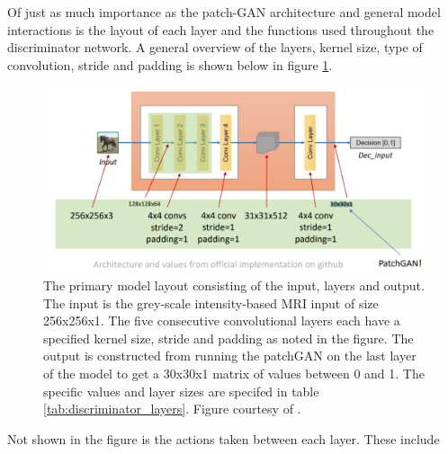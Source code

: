 \documentclass[12pt, fleqn, titlepage]{article}
\begin{document}
Of just as much importance as the patch-GAN architecture and general model interactions is the layout of each layer and the functions used throughout the discriminator network. A general overview of the layers, kernel size, type of convolution, stride and padding is shown below in figure \ref{fig:cyclegandiscriminatorlayers}.
\begin{figure}[H]
	\centering
	\includegraphics[width=0.7\linewidth]{imgs/cyclegan_discriminator_layers}
	\caption{The primary model layout consisting of the input, layers and output. The input is the grey-scale intensity-based MRI input of size 256x256x1. The five consecutive convolutional layers each have a specified kernel size, stride and padding as noted in the figure. The output is constructed from running the patchGAN on the last layer of the model to get a 30x30x1 matrix of values between 0 and 1. The specific values and layer sizes are specifed in table \ref{tab:discriminator_layers}. Figure courtesy of \cite{cyclegan_figures}.}
	\label{fig:cyclegandiscriminatorlayers}
\end{figure}

Not shown in the figure is the actions taken between each layer. These include 
\end{document}
